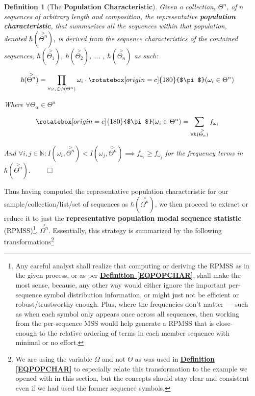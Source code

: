 \documentclass[a4paper, 18pt]{book} %
\newtheorem{defn}{Definition}
\newcommand{\invpi}{\rotatebox[origin=c]{180}{$\pi$}}
\begin{document}
\vspace{1em}
\begin{defn}[The \textbf{Population Characteristic}]
\label{DEFPOPCHAR}
Given a collection, $\Theta^n$, of $n$ sequences of arbitrary length and composition, the representative \textbf{population characteristic}, that summarizes all the sequences within that population, denoted $\hbar(\overset{>}{\Theta^n})$, is derived from the sequence characteristics of the contained sequences, $\hbar(\overset{>}{\Theta_1})$, $\hbar(\overset{>}{\Theta_2})$, ... , $\hbar(\overset{>}{\Theta_n})$ as such:

\vspace{1em}
\begin{equation}
\label{EQPOPCHAR}
\hbar(\overset{>}{\Theta^n}) = \prod\limits_{\forall \omega_i \in \psi(\Theta^n)} \omega_i \cdot \invpi(\omega_i \in \Theta^n)
\end{equation}
\vspace{1em}

Where $\forall \Theta_\alpha \in \Theta^n$

\vspace{1em}
\begin{equation}
\invpi(\omega_i \in \Theta^n) = \sum\limits_{\forall \hbar(\overset{>}{\Theta_\alpha})} f_{\omega_i}
\end{equation}
\vspace{1em}

And $\forall i, j \in \mathbb{N}: I(\omega_i,\overset{>}{\Theta^n}) < I(\omega_j,\overset{>}{\Theta^n}) \implies f_{\omega_i} \geq f_{\omega_j}$ for the frequency terms in $\hbar(\overset{>}{\Theta^n})$.
$\qed$
\end{defn}
\vspace{1em}


Thus having computed the representative population characteristic for our sample/collection/list/set of sequences as $\hbar(\overset{>}{\Omega^n})$, we then proceed to extract or reduce it to just the \textbf{representative population modal sequence statistic} (RPMSS)\footnote{Any careful analyst shall realize that computing or deriving the RPMSS as in the given process, or as per \textbf{\hyperref[EQPOPCHAR]{Definition \ref{EQPOPCHAR}}}, shall make the most sense, because, any other way would either ignore the important per-sequence symbol distribution information, or might just not be efficient or robust/trustworthy enough. Plus, where the frequencies don't matter --- such as when each symbol only appears once across all sequences, then working from the per-sequence MSS would help generate a RPMSS that is close-enough to the relative ordering of terms in each member sequence with minimal or no effort.}, $\overset{>}{\Omega^n}$. Essentially, this strategy is summarized by the following transformations\footnote{We are using the variable $\Omega$ and not $\Theta$ as was used in \textbf{\hyperref[EQPOPCHAR]{Definition \ref{EQPOPCHAR}}} to especially relate this transformation to the example we opened with in this section, but the concepts should stay clear and consistent even if we had used the former sequence symbols.}
\end{document}
